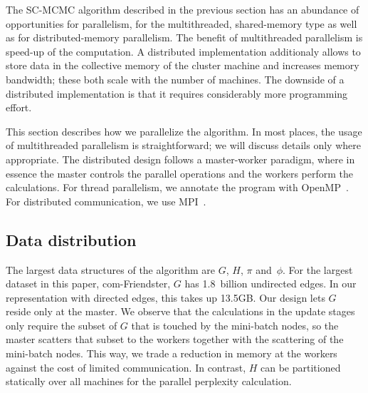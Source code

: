 \begin{comment}
- pi storage: DKV
   . pi/phi is read in 3), 4), 5a), 7)
   . pi is written in 4); read[i], then write[i], so no other data dependencies
   . so access is very synchronous: either read-only, or write without
     concurrent readers
   . DKV store properties:
      - single-sized keys
      - contiguous key space (integers 0..N-1)
      - update-only writes: no new KVs, no deletes
     so: no load imbalance, no hashing that is worth its name
      - no read/write or write/write concurrency
     so:
      - build RDMA store with remote reads and remote writes only, with exactly
        one RDMA transaction per read or write
\end{comment}



The SC-MCMC algorithm described in the previous section has an abundance of
opportunities for parallelism, for the multithreaded, shared-memory type as
well as for distributed-memory parallelism. The benefit of multithreaded
parallelism is speed-up of the computation. A distributed implementation
additionaly allows to store data in the collective memory of the cluster
machine and increases memory bandwidth; these both scale with the number of
machines. The downside of a distributed implementation is that it requires
considerably more programming effort.


This section describes how we parallelize the algorithm.
In most places, the usage of multithreaded parallelism
is straightforward; we will discuss details only where appropriate. The
distributed design follows a master-worker paradigm, where in essence
the master controls the parallel operations and the workers perform the
calculations. For thread parallelism, we annotate the program with
OpenMP~\cite{OpenMPSpec}. For distributed communication, we use
MPI~\cite{Forum:1994:MMI:898758}.


\subsection{Data distribution}

The largest data structures of the algorithm are $G$, $H$, $\pi$ and~$\phi$.
For the largest dataset in this paper, com-Friendster, $G$ has 1.8~billion
undirected edges. In our representation with directed edges, this takes
up 13.5GB. Our design lets $G$ reside only at the master. We observe that
the calculations in the update stages only require the subset of $G$ that
is touched by the mini-batch nodes, so the master scatters that subset to
the workers together with the scattering of the mini-batch nodes. This way,
we trade a reduction in memory at the workers against the cost of limited
communication. In contrast, $H$ can be partitioned statically over all
machines for the parallel perplexity calculation.

